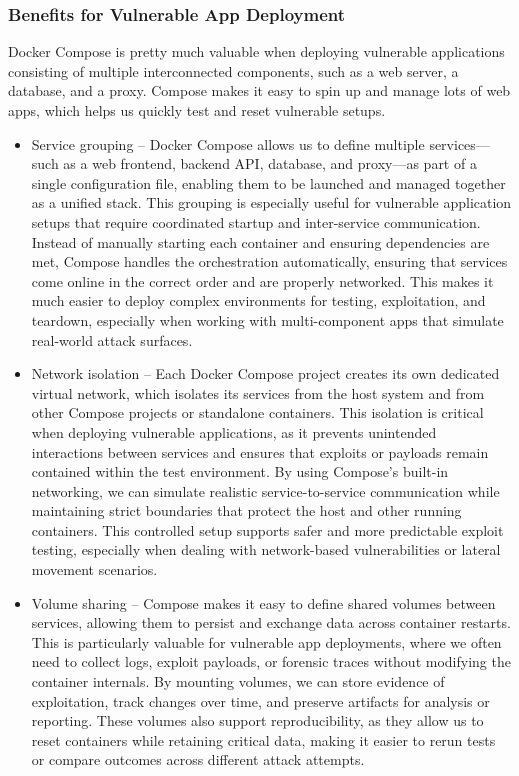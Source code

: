\documentclass[12pt,titlepage]{article}
\begin{document}
\subsubsection{Benefits for Vulnerable App Deployment}

Docker Compose is pretty much valuable when deploying vulnerable applications consisting of multiple interconnected components, such as a web server, a database, and a proxy. Compose makes it easy to spin up and manage lots of web apps, which helps us quickly test and reset vulnerable setups.

\begin{itemize}
    \item{Service grouping} – Docker Compose allows us to define multiple services—such as a web frontend, backend API, database, and proxy—as part of a single configuration file, enabling them to be launched and managed together as a unified stack. This grouping is especially useful for vulnerable application setups that require coordinated startup and inter-service communication. Instead of manually starting each container and ensuring dependencies are met, Compose handles the orchestration automatically, ensuring that services come online in the correct order and are properly networked. This makes it much easier to deploy complex environments for testing, exploitation, and teardown, especially when working with multi-component apps that simulate real-world attack surfaces.
    
    \item{Network isolation} – Each Docker Compose project creates its own dedicated virtual network, which isolates its services from the host system and from other Compose projects or standalone containers. This isolation is critical when deploying vulnerable applications, as it prevents unintended interactions between services and ensures that exploits or payloads remain contained within the test environment. By using Compose’s built-in networking, we can simulate realistic service-to-service communication while maintaining strict boundaries that protect the host and other running containers. This controlled setup supports safer and more predictable exploit testing, especially when dealing with network-based vulnerabilities or lateral movement scenarios.
    
    \item{Volume sharing} – Compose makes it easy to define shared volumes between services, allowing them to persist and exchange data across container restarts. This is particularly valuable for vulnerable app deployments, where we often need to collect logs, exploit payloads, or forensic traces without modifying the container internals. By mounting volumes, we can store evidence of exploitation, track changes over time, and preserve artifacts for analysis or reporting. These volumes also support reproducibility, as they allow us to reset containers while retaining critical data, making it easier to rerun tests or compare outcomes across different attack attempts.
    

\end{itemize}
\end{document}
